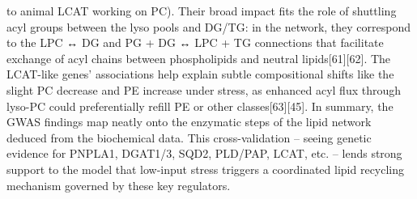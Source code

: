 \documentclass[10pt,letterpaper]{article}
\begin{document}
\begin{itemize}
to animal LCAT working on PC). Their broad impact fits the role of shuttling acyl groups between the lyso pools and DG/TG: in the network, they correspond to the LPC ↔ DG and PG + DG ↔ LPC + TG connections that facilitate exchange of acyl chains between phospholipids and neutral lipids[61][62]. The LCAT-like genes’ associations help explain subtle compositional shifts like the slight PC decrease and PE increase under stress, as enhanced acyl flux through lyso-PC could preferentially refill PE or other classes[63][45]. In summary, the GWAS findings map neatly onto the enzymatic steps of the lipid network deduced from the biochemical data. This cross-validation – seeing genetic evidence for PNPLA1, DGAT1/3, SQD2, PLD/PAP, LCAT, etc. – lends strong support to the model that low-input stress triggers a coordinated lipid recycling mechanism governed by these key regulators.

\end{itemize}
\end{document}
